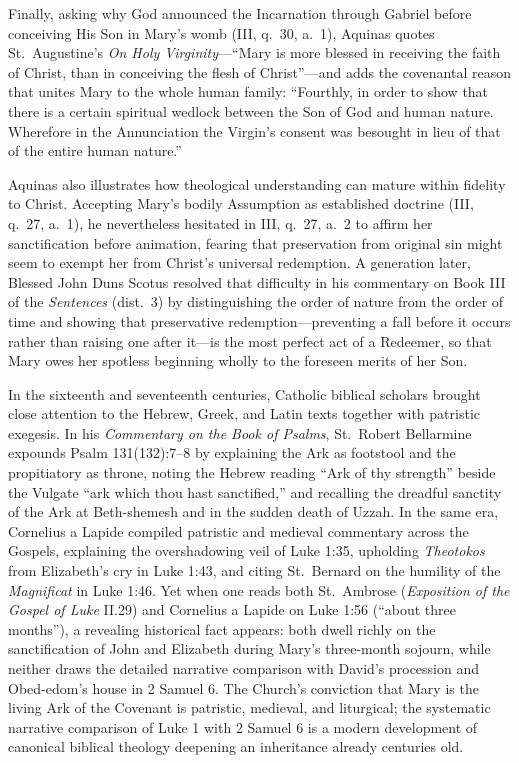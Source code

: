Finally, asking why God announced the Incarnation through Gabriel before conceiving His Son in Mary's womb (III, q.\ 30, a.\ 1), Aquinas quotes St.\ Augustine's \textit{On Holy Virginity}---``Mary is more blessed in receiving the faith of Christ, than in conceiving the flesh of Christ''---and adds the covenantal reason that unites Mary to the whole human family: ``Fourthly, in order to show that there is a certain spiritual wedlock between the Son of God and human nature. Wherefore in the Annunciation the Virgin's consent was besought in lieu of that of the entire human nature.''

Aquinas also illustrates how theological understanding can mature within fidelity to Christ. Accepting Mary's bodily Assumption as established doctrine (III, q.\ 27, a.\ 1), he nevertheless hesitated in III, q.\ 27, a.\ 2 to affirm her sanctification before animation, fearing that preservation from original sin might seem to exempt her from Christ's universal redemption. A generation later, Blessed John Duns Scotus resolved that difficulty in his commentary on Book III of the \textit{Sentences} (dist.\ 3) by distinguishing the order of nature from the order of time and showing that preservative redemption---preventing a fall before it occurs rather than raising one after it---is the most perfect act of a Redeemer, so that Mary owes her spotless beginning wholly to the foreseen merits of her Son.

In the sixteenth and seventeenth centuries, Catholic biblical scholars brought close attention to the Hebrew, Greek, and Latin texts together with patristic exegesis. In his \textit{Commentary on the Book of Psalms}, St.\ Robert Bellarmine expounds Psalm 131(132):7--8 by explaining the Ark as footstool and the propitiatory as throne, noting the Hebrew reading ``Ark of thy strength'' beside the Vulgate ``ark which thou hast sanctified,'' and recalling the dreadful sanctity of the Ark at Beth-shemesh and in the sudden death of Uzzah. In the same era, Cornelius a Lapide compiled patristic and medieval commentary across the Gospels, explaining the overshadowing veil of Luke 1:35, upholding \textit{Theotokos} from Elizabeth's cry in Luke 1:43, and citing St.\ Bernard on the humility of the \textit{Magnificat} in Luke 1:46. Yet when one reads both St.\ Ambrose (\textit{Exposition of the Gospel of Luke} II.29) and Cornelius a Lapide on Luke 1:56 (``about three months''), a revealing historical fact appears: both dwell richly on the sanctification of John and Elizabeth during Mary's three-month sojourn, while neither draws the detailed narrative comparison with David's procession and Obed-edom's house in 2 Samuel 6. The Church's conviction that Mary is the living Ark of the Covenant is patristic, medieval, and liturgical; the systematic narrative comparison of Luke 1 with 2 Samuel 6 is a modern development of canonical biblical theology deepening an inheritance already centuries old.

